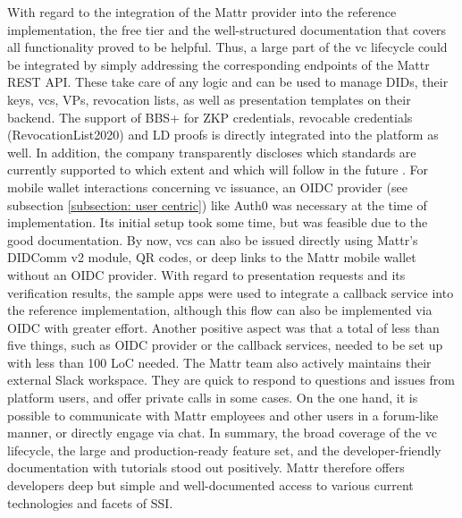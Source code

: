         With regard to the integration of the Mattr provider into the reference implementation, the free tier and the well-structured documentation that covers all functionality proved to be helpful. Thus, a large part of the \ac{vc} lifecycle could be integrated by simply addressing the corresponding endpoints of the Mattr REST API. These take care of any logic and can be used to manage \acp{DID}, their keys, \acp{vc}, \acp{VP}, revocation lists, as well as presentation templates on their backend. The support of BBS+ for \ac{ZKP} credentials, revocable credentials (RevocationList2020) and LD proofs is directly integrated into the platform as well. In addition, the company transparently discloses which standards are currently supported to which extent and which will follow in the future \cite{mattr_supported_2021, mattr_upcoming_2021}. For mobile wallet interactions concerning \ac{vc} issuance, an \ac{OIDC} provider (see subsection \ref{subsection: user centric}) like Auth0 was necessary at the time of implementation. Its initial setup took some time, but was feasible due to the good documentation. By now, \acp{vc} can also be issued directly using Mattr's DIDComm v2 module, QR codes, or deep links to the Mattr mobile wallet without an \ac{OIDC} provider. With regard to presentation requests and its verification results, the sample apps were used to integrate a callback service into the reference implementation, although this flow can also be implemented via \ac{OIDC} with greater effort. Another positive aspect was that a total of less than five things, such as OIDC provider or the callback services, needed to be set up with less than 100 LoC needed. The Mattr team also actively maintains their external Slack workspace. They are quick to respond to questions and issues from platform users, and offer private calls in some cases. On the one hand, it is possible to communicate with Mattr employees and other users in a forum-like manner, or directly engage via chat. In summary, the broad coverage of the \ac{vc} lifecycle, the large and production-ready feature set, and the developer-friendly documentation with tutorials stood out positively. Mattr therefore offers developers deep but simple and well-documented access to various current technologies and facets of \ac{SSI}.
    
